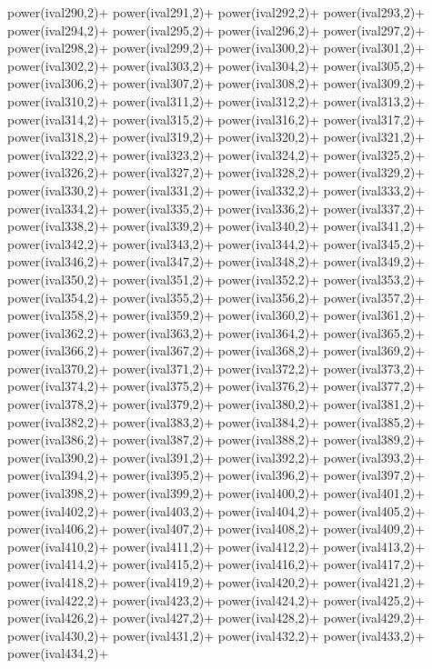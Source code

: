 \begin{DoxyCode}
{power(ival290,2)+
power(ival291,2)+
power(ival292,2)+
power(ival293,2)+
power(ival294,2)+
power(ival295,2)+
power(ival296,2)+
power(ival297,2)+
power(ival298,2)+
power(ival299,2)+
power(ival300,2)+
power(ival301,2)+
power(ival302,2)+
power(ival303,2)+
power(ival304,2)+
power(ival305,2)+
power(ival306,2)+
power(ival307,2)+
power(ival308,2)+
power(ival309,2)+
power(ival310,2)+
power(ival311,2)+
power(ival312,2)+
power(ival313,2)+
power(ival314,2)+
power(ival315,2)+
power(ival316,2)+
power(ival317,2)+
power(ival318,2)+
power(ival319,2)+
power(ival320,2)+
power(ival321,2)+
power(ival322,2)+
power(ival323,2)+
power(ival324,2)+
power(ival325,2)+
power(ival326,2)+
power(ival327,2)+
power(ival328,2)+
power(ival329,2)+
power(ival330,2)+
power(ival331,2)+
power(ival332,2)+
power(ival333,2)+
power(ival334,2)+
power(ival335,2)+
power(ival336,2)+
power(ival337,2)+
power(ival338,2)+
power(ival339,2)+
power(ival340,2)+
power(ival341,2)+
power(ival342,2)+
power(ival343,2)+
power(ival344,2)+
power(ival345,2)+
power(ival346,2)+
power(ival347,2)+
power(ival348,2)+
power(ival349,2)+
power(ival350,2)+
power(ival351,2)+
power(ival352,2)+
power(ival353,2)+
power(ival354,2)+
power(ival355,2)+
power(ival356,2)+
power(ival357,2)+
power(ival358,2)+
power(ival359,2)+
power(ival360,2)+
power(ival361,2)+
power(ival362,2)+
power(ival363,2)+
power(ival364,2)+
power(ival365,2)+
power(ival366,2)+
power(ival367,2)+
power(ival368,2)+
power(ival369,2)+
power(ival370,2)+
power(ival371,2)+
power(ival372,2)+
power(ival373,2)+
power(ival374,2)+
power(ival375,2)+
power(ival376,2)+
power(ival377,2)+
power(ival378,2)+
power(ival379,2)+
power(ival380,2)+
power(ival381,2)+
power(ival382,2)+
power(ival383,2)+
power(ival384,2)+
power(ival385,2)+
power(ival386,2)+
power(ival387,2)+
power(ival388,2)+
power(ival389,2)+
power(ival390,2)+
power(ival391,2)+
power(ival392,2)+
power(ival393,2)+
power(ival394,2)+
power(ival395,2)+
power(ival396,2)+
power(ival397,2)+
power(ival398,2)+
power(ival399,2)+
power(ival400,2)+
power(ival401,2)+
power(ival402,2)+
power(ival403,2)+
power(ival404,2)+
power(ival405,2)+
power(ival406,2)+
power(ival407,2)+
power(ival408,2)+
power(ival409,2)+
power(ival410,2)+
power(ival411,2)+
power(ival412,2)+
power(ival413,2)+
power(ival414,2)+
power(ival415,2)+
power(ival416,2)+
power(ival417,2)+
power(ival418,2)+
power(ival419,2)+
power(ival420,2)+
power(ival421,2)+
power(ival422,2)+
power(ival423,2)+
power(ival424,2)+
power(ival425,2)+
power(ival426,2)+
power(ival427,2)+
power(ival428,2)+
power(ival429,2)+
power(ival430,2)+
power(ival431,2)+
power(ival432,2)+
power(ival433,2)+
power(ival434,2)+
}
\end{DoxyCode}
